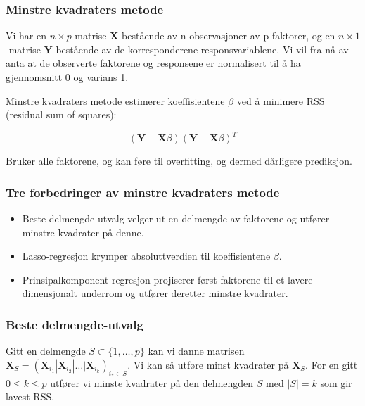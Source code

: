 \documentclass[aspectratio=169]{beamer}
\begin{document}
\begin{frame}
  \frametitle{Minstre kvadraters metode}

  Vi har en \(n\times p\)-matrise \(\textbf{X}\) bestående av n observasjoner av p faktorer, og en \(n\times 1\)-matrise \(\textbf{Y}\) bestående av de korresponderene responsvariablene. Vi vil fra nå av anta at de observerte faktorene og responsene er normalisert til å ha gjennomsnitt 0 og varians 1.

  \pause

  Minstre kvadraters metode estimerer koeffisientene \(\beta\) ved å minimere RSS (residual sum of squares):

  \begin{equation}
    (\textbf{Y} - \textbf{X}\beta)(\textbf{Y} - \textbf{X}\beta)^T
  \end{equation}

  \pause
  Bruker alle faktorene, og kan føre til overfitting, og dermed dårligere prediksjon.
\end{frame}

\begin{frame}
  \frametitle{Tre forbedringer av minstre kvadraters metode}
  \begin{itemize}
    \item Beste delmengde-utvalg velger ut en delmengde av faktorene og utfører minstre kvadrater på denne.
    \pause
  \item Lasso-regresjon krymper absoluttverdien til koeffisientene \(\beta\).
    \pause
    \item Prinsipalkomponent-regresjon projiserer først faktorene til et lavere-dimensjonalt underrom og utfører deretter minstre kvadrater.
  \end{itemize}
\end{frame}

\begin{frame}
  \frametitle{Beste delmengde-utvalg}
  Gitt en delmengde \(S \subset \{1,\dots,p\}\) kan vi danne matrisen \(\textbf{X}_S = (\textbf{X}_{i_1}|\textbf{X}_{i_2}|\dots |\textbf{X}_{i_k})_{i_* \in S}\).
  Vi kan så utføre minst kvadrater på \(\textbf{X}_S\).
  \pause
  For en gitt \(0 \leq k \leq p\) utfører vi minste kvadrater på den delmengden \(S\) med \(|S| = k\) som gir lavest RSS.
\end{frame}
\end{document}
